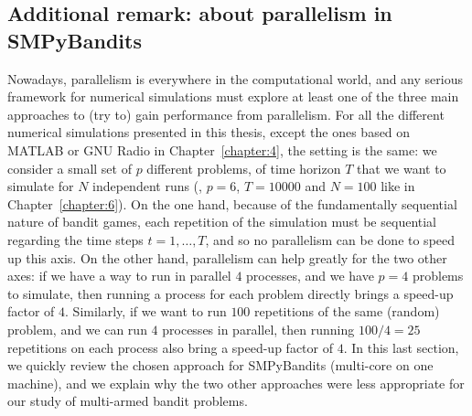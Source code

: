 

\subsection{Additional remark: about parallelism in SMPyBandits}
\label{sub:3:parallelSimulations}


Nowadays, parallelism is everywhere in the computational world, and any serious framework for numerical simulations must explore at least one of the three main approaches to (try to) gain performance from parallelism.
%
For all the different numerical simulations presented in this thesis, except the ones based on MATLAB or GNU Radio in Chapter~\ref{chapter:4}, the setting is the same: we consider a small set of $p$ different problems, of time horizon $T$ that we want to simulate for $N$ independent runs (\eg, $p=6$, $T=10000$ and $N=100$ like in Chapter~\ref{chapter:6}).
On the one hand, because of the fundamentally sequential nature of bandit games, each repetition of the simulation must be sequential regarding the time steps $t=1,\dots,T$, and so no parallelism can be done to speed up this axis.
On the other hand, parallelism can help greatly for the two other axes: if we have a way to run in parallel $4$ processes, and we have $p=4$ problems to simulate, then running a process for each problem directly brings a speed-up factor of $4$.
Similarly, if we want to run $100$ repetitions of the same (random) problem, and we can run $4$ processes in parallel, then running $100/4=25$ repetitions on each process also bring a speed-up factor of $4$.
%
In this last section, we quickly review the chosen approach for SMPyBandits (multi-core on one machine), and we explain why the two other approaches were less appropriate for our study of multi-armed bandit problems.

